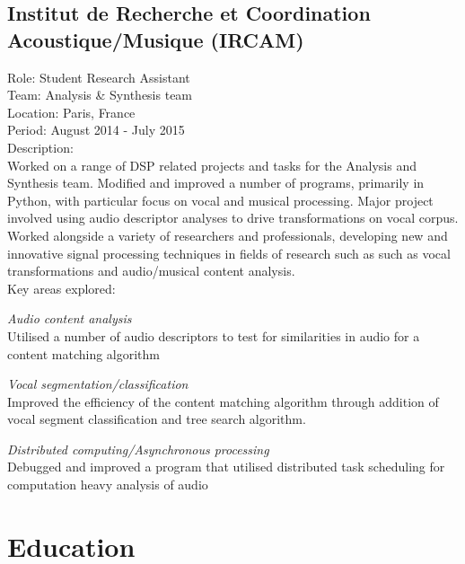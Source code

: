 \documentclass[10pt,letterpaper]{article}
\renewenvironment{itemize}{
  \begin{list}{}{
    \setlength{\leftmargin}{1.5em}
    \setlength{\itemsep}{0.25em}
    \setlength{\parskip}{0pt}
    \setlength{\parsep}{0.25em}
  }
}{
  \end{list}
}
\begin{document}
\subsection*{Institut de Recherche et Coordination Acoustique/Musique (IRCAM)}
    Role: Student Research Assistant \\
    Team: Analysis \& Synthesis team \\
    Location: Paris, France \\
    Period: August 2014 - July 2015 \\
    \newline
    Description: \\
    Worked on a range of DSP related projects and tasks for the Analysis and
    Synthesis team. Modified and improved a number of programs, primarily in
    Python, with particular focus on vocal and musical processing.  Major
    project involved using audio descriptor analyses to drive transformations
    on vocal corpus. Worked alongside a variety of researchers and
    professionals, developing new and innovative signal processing techniques in
    fields of research such as such as vocal transformations and audio/musical
    content analysis. \\
    \newline
    Key areas explored:
    \begin{itemize}
        \item \textit{Audio content analysis}\\
            Utilised a number of audio descriptors to test for similarities in
            audio for a content matching algorithm
        \item \textit{Vocal segmentation/classification}\\
            Improved the efficiency of the content matching algorithm through
            addition of vocal segment classification and tree search algorithm.
        \item \textit{Distributed computing/Asynchronous processing}\\
            Debugged and improved a program that utilised distributed task
            scheduling for computation heavy analysis of audio
    \end{itemize}

\newpage

\section*{Education}
\end{document}
